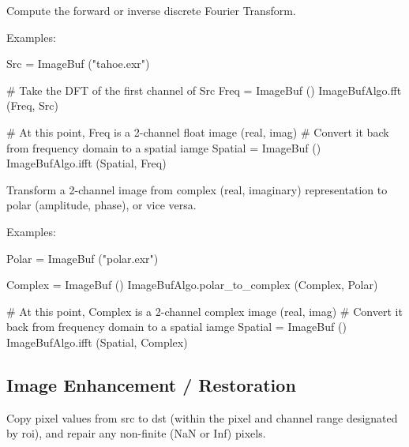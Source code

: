 Compute the forward or inverse discrete Fourier Transform.

\smallskip
\noindent Examples:
\begin{code}
    Src = ImageBuf ("tahoe.exr")

    # Take the DFT of the first channel of Src
    Freq = ImageBuf ()
    ImageBufAlgo.fft (Freq, Src)

    # At this point, Freq is a 2-channel float image (real, imag)
    # Convert it back from frequency domain to a spatial iamge
    Spatial = ImageBuf ()
    ImageBufAlgo.ifft (Spatial, Freq)
\end{code}
\apiend


 
 

Transform a 2-channel image from complex (real, imaginary) representation
to polar (amplitude, phase), or vice versa.

\smallskip
\noindent Examples:
\begin{code}
    Polar = ImageBuf ("polar.exr")

    Complex = ImageBuf ()
    ImageBufAlgo.polar_to_complex (Complex, Polar)

    # At this point, Complex is a 2-channel complex image (real, imag)
    # Convert it back from frequency domain to a spatial iamge
    Spatial = ImageBuf ()
    ImageBufAlgo.ifft (Spatial, Complex)
\end{code}
\apiend



\subsection{Image Enhancement / Restoration}
\label{sec:iba:py:enhance}

 

Copy pixel values from {\cf src} to {\cf dst} (within the pixel and channel
range designated by {\cf roi}), and repair any non-finite ({\cf NaN} or {\cf
Inf}) pixels.

